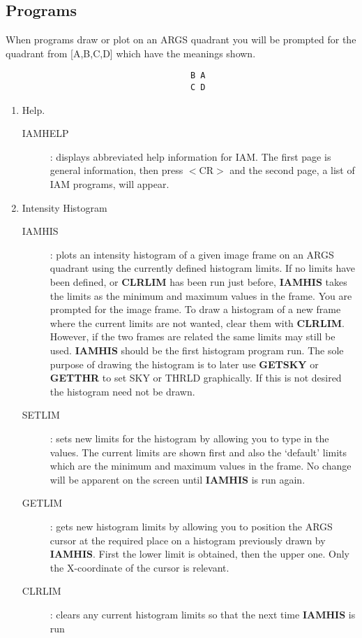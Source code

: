 \subsection {Programs}
When programs draw or plot on an ARGS quadrant you will be prompted for the
quadrant from [A,B,C,D] which have the meanings shown.
\begin{verbatim}
                                     B A
                                     C D
\end{verbatim}
\begin{enumerate}
\item Help.
\begin{description}
\item [IAMHELP]:
displays abbreviated help information for IAM.
The first page is general information, then press $<$CR$>$ and the second page,
a list of IAM programs, will appear.
\end{description}
\item Intensity Histogram
\begin{description}
\item [IAMHIS]:
plots an intensity histogram of a given image frame on an ARGS quadrant using
the currently defined histogram limits.
If no limits have been defined, or {\bf CLRLIM} has been run just before,
{\bf IAMHIS} takes the limits as the minimum and maximum values in the frame.
You are prompted for the image frame.
To draw a histogram of a new frame where the current limits are not wanted,
clear them with {\bf CLRLIM}.
However, if the two frames are related the same limits may still be used.
{\bf IAMHIS} should be the first histogram program run.
The sole purpose of drawing the histogram is to later use {\bf GETSKY} or
{\bf GETTHR} to set SKY or THRLD graphically.
If this is not desired the histogram need not be drawn.
\item [SETLIM]:
sets new limits for the histogram by allowing you to type in the values.
The current limits are shown first and also the `default' limits which are the
minimum and maximum values in the frame.
No change will be apparent on the screen until {\bf IAMHIS} is run again.
\item [GETLIM]:
gets new histogram limits by allowing you to position the ARGS cursor at the
required place on a histogram previously drawn by {\bf IAMHIS}.
First the lower limit is obtained, then the upper one.
Only the X-coordinate of the cursor is relevant.
\item [CLRLIM]:
clears any current histogram limits so that the next time {\bf IAMHIS} is run

\end{description}
\end{enumerate}
